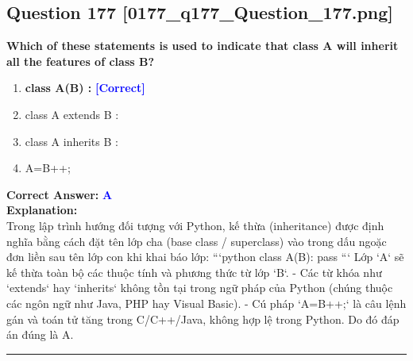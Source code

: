 \documentclass[11pt,a4paper]{article}
\begin{document}
\begin{minipage}{\textwidth}
\subsection*{Question 177 \quad \footnotesize{[0177_q177_Question_177.png]}}
\noindent \textbf{Which of these statements is used to indicate that class A will inherit all the features of class B?}

\begin{enumerate}[label=\Alph*.]
    \item \textbf{class A(B) :} \hfill \textcolor{blue}{\textbf{[Correct]}}
    \item class A extends B :
    \item class A inherits B :
    \item A=B++;
\end{enumerate}

\noindent \textbf{Correct Answer:} \textcolor{blue}{\textbf{A}} \\[4pt]
\noindent \textbf{Explanation:}\\
Trong lập trình hướng đối tượng với Python, kế thừa (inheritance) được định nghĩa bằng cách đặt tên lớp cha (base class / superclass) vào trong dấu ngoặc đơn liền sau tên lớp con khi khai báo lớp:\newline
```python\newline
class A(B):\newline
    pass\newline
```\newline
Lớp `A` sẽ kế thừa toàn bộ các thuộc tính và phương thức từ lớp `B`.\newline
- Các từ khóa như `extends` hay `inherits` không tồn tại trong ngữ pháp của Python (chúng thuộc các ngôn ngữ như Java, PHP hay Visual Basic).\newline
- Cú pháp `A=B++;` là câu lệnh gán và toán tử tăng trong C/C++/Java, không hợp lệ trong Python.\newline
Do đó đáp án đúng là A.
\end{minipage}
\vspace{0.8cm}
\hrule
\vspace{0.5cm}
\end{document}
